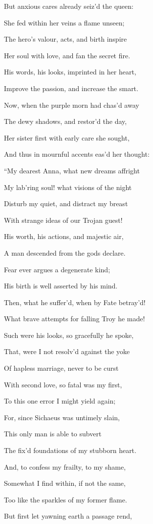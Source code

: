 But anxious cares already seiz’d the queen:

She fed within her veins a flame unseen;

The hero’s valour, acts, and birth inspire

Her soul with love, and fan the secret fire.

His words, his looks, imprinted in her heart,

Improve the passion, and increase the smart.

Now, when the purple morn had chas’d away

The dewy shadows, and restor’d the day,

Her sister first with early care she sought,

And thus in mournful accents eas’d her thought:

“My dearest Anna, what new dreams affright

My lab’ring soul! what visions of the night

Disturb my quiet, and distract my breast

With strange ideas of our Trojan guest!

His worth, his actions, and majestic air,

A man descended from the gods declare.

Fear ever argues a degenerate kind;

His birth is well asserted by his mind.

Then, what he suffer’d, when by Fate betray’d!

What brave attempts for falling Troy he made!

Such were his looks, so gracefully he spoke,

That, were I not resolv’d against the yoke

Of hapless marriage, never to be curst

With second love, so fatal was my first,

To this one error I might yield again;

For, since Sichaeus was untimely slain,

This only man is able to subvert

The fix’d foundations of my stubborn heart.

And, to confess my frailty, to my shame,

Somewhat I find within, if not the same,

Too like the sparkles of my former flame.

But first let yawning earth a passage rend,

